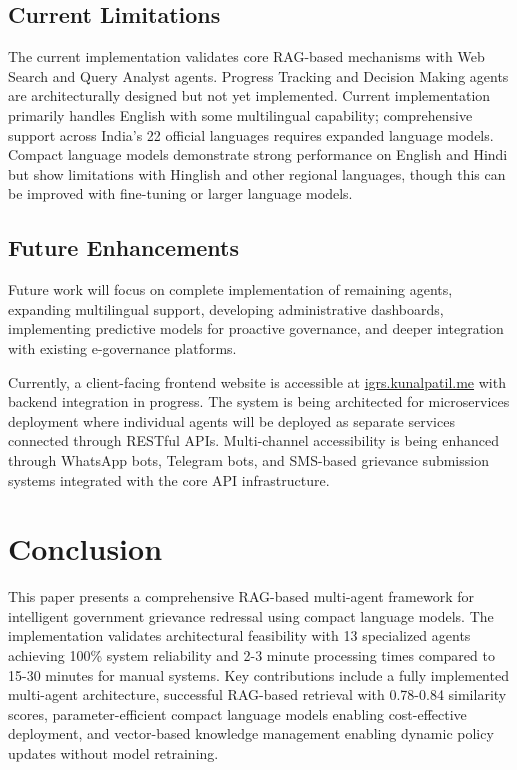 \documentclass[conference]{IEEEtran}
\begin{document}
\subsection{Current Limitations}

The current implementation validates core RAG-based mechanisms with Web Search and Query Analyst agents. Progress Tracking and Decision Making agents are architecturally designed but not yet implemented. Current implementation primarily handles English with some multilingual capability; comprehensive support across India's 22 official languages requires expanded language models. Compact language models demonstrate strong performance on English and Hindi but show limitations with Hinglish and other regional languages, though this can be improved with fine-tuning or larger language models.

\subsection{Future Enhancements}

Future work will focus on complete implementation of remaining agents, expanding multilingual support, developing administrative dashboards, implementing predictive models for proactive governance, and deeper integration with existing e-governance platforms.

Currently, a client-facing frontend website is accessible at \href{https://igrs.kunalpatil.me}{igrs.kunalpatil.me}  with backend integration in progress. The system is being architected for microservices deployment where individual agents will be deployed as separate services connected through RESTful APIs. Multi-channel accessibility is being enhanced through WhatsApp bots, Telegram bots, and SMS-based grievance submission systems integrated with the core API infrastructure.

\section{Conclusion}

This paper presents a comprehensive RAG-based multi-agent framework for intelligent government grievance redressal using compact language models. The implementation validates architectural feasibility with 13 specialized agents achieving 100\% system reliability and 2-3 minute processing times compared to 15-30 minutes for manual systems. Key contributions include a fully implemented multi-agent architecture, successful RAG-based retrieval with 0.78-0.84 similarity scores, parameter-efficient compact language models enabling cost-effective deployment, and vector-based knowledge management enabling dynamic policy updates without model retraining.
\end{document}
